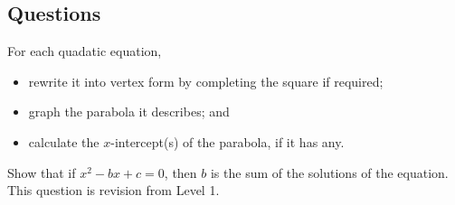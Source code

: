 \clearpage
\subsection*{Questions}
\begin{questions}
  \question For each quadatic equation,
            \begin{itemize}
              \item rewrite it into vertex form by completing the square if required;
              \item graph the parabola it describes; and
              \item calculate the $ x$-intercept(s) of the parabola, if it has any.
            \end{itemize}
  \question Show that if $ x^2 - bx + c = 0 $, then $ b $ is the sum of the solutions of the equation.
  \question This question is revision from Level 1.
\end{questions}
